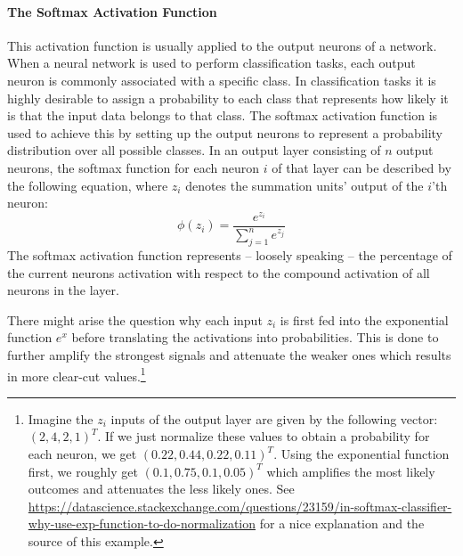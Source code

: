 \paragraph{The Softmax Activation Function}
This activation function is usually applied to the output neurons of
a network. When a neural network is used to perform classification
tasks, each output neuron is commonly associated with a specific
class. In classification tasks it is highly desirable to assign a
probability to each class that represents how likely it is that the
input data belongs to that class. The softmax activation function is
used to achieve this by setting up the output neurons to represent a
probability distribution over all possible classes.
In an output layer consisting of \(n\) output neurons, the softmax
function for each neuron \(i\) of that layer can be described by the
following equation, where \(z_i\) denotes the summation units' output of
the \(i\)'th neuron:
\begin{equation}
  \phi(z_i) = \frac{e^{z_i}}{\sum_{j=1}^{n}{e^{z_j}}}
\end{equation}
The softmax activation function represents -- loosely speaking -- the
percentage of the current neurons activation with respect to the compound
activation of all neurons in the layer.

There might arise the question why each input \(z_i\) is first fed
into the exponential function \(e^x\) before translating the
activations into probabilities. This is done to further amplify the
strongest signals and attenuate the weaker ones which results in more
clear-cut values.\footnote{Imagine the \(z_i\) inputs of the output
  layer are given by the following vector: \((2, 4, 2, 1)^T\). If we
  just normalize these values to obtain a probability for each neuron,
  we get \((0.22, 0.44, 0.22, 0.11)^T\). Using the exponential
  function first, we roughly get \((0.1, 0.75, 0.1, 0.05)^T\) which
  amplifies the most likely outcomes and attenuates the less likely
  ones. See
  \url{https://datascience.stackexchange.com/questions/23159/in-softmax-classifier-why-use-exp-function-to-do-normalization}
  for a nice explanation and the source of this example.}

